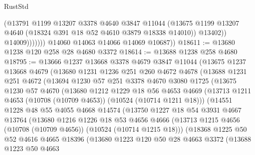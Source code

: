 \begin{lexlean}{RustStd}
\begin{coremodule}
                        (@13791
                          @1199
                          @13207
                          @3378
                          @4640
                          @3847
                          @11044
                          (@13675
                            @1199
                            @13207
                            @4640
                            (@18324 @391 @18 @52 @4610 @3879 @18338 @14010))
                          @13402))
                      @14009)))))))
        @14060
        @14063
        @14066
        @14069
        @10687))
@18611 := @13680 @1238 @120 @258 @28 @4680 @3372
@18614 := @13688 @1238 @258 @4680
@18795 := @13666
    @1237
    @13668
    @3378
    @4679
    @3847
    @11044
    (@13675
      @1237
      @13668
      @4679
      (@13680
        @1231
        @1236
        @251
        @260
        @4672
        @4678
        (@13688
          @1231
          @251
          @4672
          (@13694
            @1230
            @57
            @251
            @3378
            @4670
            @3080
            @1725
            (@13675
              @1230
              @57
              @4670
              (@13680
                @1212
                @1229
                @18
                @56
                @4653
                @4669
                (@13713 @1211 @4653 (@10708 (@10709 @4653)) (@10524 (@10714 @1211 @18)))
                (@14551
                  @1228
                  @48
                  @55
                  @4055
                  @4668
                  @14574
                  (@13750
                    @1227
                    @18
                    @54
                    @3931
                    @4667
                    @13764
                    (@13680
                      @1216
                      @1226
                      @18
                      @53
                      @4656
                      @4666
                      (@13713 @1215 @4656 (@10708 (@10709 @4656)) (@10524 (@10714 @1215 @18)))
                      (@18368
                        @1225
                        @50
                        @52
                        @4616
                        @4665
                        @18396
                        (@13680
                          @1223
                          @120
                          @50
                          @28
                          @4663
                          @3372
                          (@13688
                            @1223
                            @50
                            @4663

\end{coremodule}
\end{lexlean}
